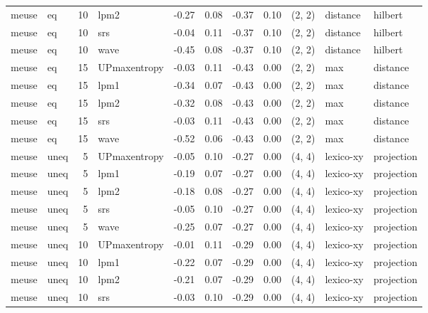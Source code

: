 \begin{tabular}{llrlrrrrlll}
 meuse &    eq & 10 &         lpm2 & -0.27 &     0.08 &  -0.37 &       0.10 & (2, 2) &  distance &    hilbert \\
 meuse &    eq & 10 &          srs & -0.04 &     0.11 &  -0.37 &       0.10 & (2, 2) &  distance &    hilbert \\
 meuse &    eq & 10 &         wave & -0.45 &     0.08 &  -0.37 &       0.10 & (2, 2) &  distance &    hilbert \\
 meuse &    eq & 15 & UPmaxentropy & -0.03 &     0.11 &  -0.43 &       0.00 & (2, 2) &         max & distance \\
 meuse &    eq & 15 &         lpm1 & -0.34 &     0.07 &  -0.43 &       0.00 & (2, 2) &         max & distance \\
 meuse &    eq & 15 &         lpm2 & -0.32 &     0.08 &  -0.43 &       0.00 & (2, 2) &         max & distance \\
 meuse &    eq & 15 &          srs & -0.03 &     0.11 &  -0.43 &       0.00 & (2, 2) &         max & distance \\
 meuse &    eq & 15 &         wave & -0.52 &     0.06 &  -0.43 &       0.00 & (2, 2) &         max & distance \\
 meuse &  uneq &  5 & UPmaxentropy & -0.05 &     0.10 &  -0.27 &       0.00 & (4, 4) &   lexico-xy & projection \\
 meuse &  uneq &  5 &         lpm1 & -0.19 &     0.07 &  -0.27 &       0.00 & (4, 4) &   lexico-xy & projection \\
 meuse &  uneq &  5 &         lpm2 & -0.18 &     0.08 &  -0.27 &       0.00 & (4, 4) &   lexico-xy & projection \\
 meuse &  uneq &  5 &          srs & -0.05 &     0.10 &  -0.27 &       0.00 & (4, 4) &   lexico-xy & projection \\
 meuse &  uneq &  5 &         wave & -0.25 &     0.07 &  -0.27 &       0.00 & (4, 4) &   lexico-xy & projection \\
 meuse &  uneq & 10 & UPmaxentropy & -0.01 &     0.11 &  -0.29 &       0.00 & (4, 4) &   lexico-xy & projection \\
 meuse &  uneq & 10 &         lpm1 & -0.22 &     0.07 &  -0.29 &       0.00 & (4, 4) &   lexico-xy & projection \\
 meuse &  uneq & 10 &         lpm2 & -0.21 &     0.07 &  -0.29 &       0.00 & (4, 4) &   lexico-xy & projection \\
 meuse &  uneq & 10 &          srs & -0.03 &     0.10 &  -0.29 &       0.00 & (4, 4) &   lexico-xy & projection \\

\end{tabular}
